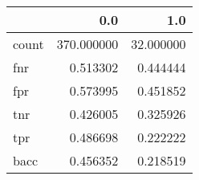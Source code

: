 \begin{tabular}{lrr}
\toprule
{} &         0.0 &        1.0 \\
\midrule
count &  370.000000 &  32.000000 \\
fnr   &    0.513302 &   0.444444 \\
fpr   &    0.573995 &   0.451852 \\
tnr   &    0.426005 &   0.325926 \\
tpr   &    0.486698 &   0.222222 \\
bacc  &    0.456352 &   0.218519 \\
\bottomrule
\end{tabular}
